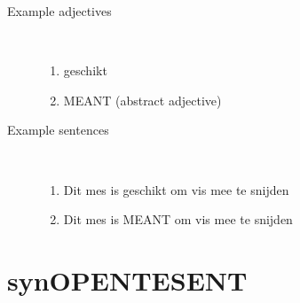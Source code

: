 \begin{description}
\begin{enumerate}
\end{enumerate}

  \item [Example adjectives] \mbox{}\\
\begin{enumerate}
  \item geschikt
  \item MEANT (abstract adjective)
\end{enumerate}
  \item [Example sentences] \mbox{}\\
\begin{enumerate}
  \item Dit mes is geschikt om vis mee te snijden
  \item Dit mes is MEANT om vis mee te snijden
\end{enumerate}
\end{description}
\newpage
\section{synOPENTESENT}
